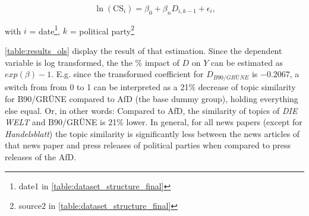 \documentclass[
]{article}
\begin{document}
\[
\ln(\text{CS}_{i})=\beta_0+\beta_nD_{i,k-1}+\epsilon_i\text{,}
\]

with \(i\) = date\footnote{date1 in
  \autoref{table:dataset_structure_final}}, \(k\) = political
party\footnote{source2 in \autoref{table:dataset_structure_final}}

\autoref{table:results_ols} display the result of that estimation. Since
the dependent variable is log transformed, the the \% impact of \(D\) on
\(Y\) can be estimated as \(exp(\beta)-1\). E.g. since the transformed
coefficient for \(D_{B90/GRÜNE}\) is \(-0.2067\), a switch from from 0
to 1 can be interpreted as a 21\% decrease of topic similarity for
B90/GRÜNE compared to AfD (the base dummy group), holding everything
else equal. Or, in other words: Compared to AfD, the similarity of
topics of \emph{DIE WELT} and B90/GRÜNE is 21\% lower. In general, for
all news papers (except for \emph{Handelsblatt}) the topic similarity is
significantly less between the news articles of that news paper and
press releases of political parties when compared to press releases of
the AfD.
\end{document}
